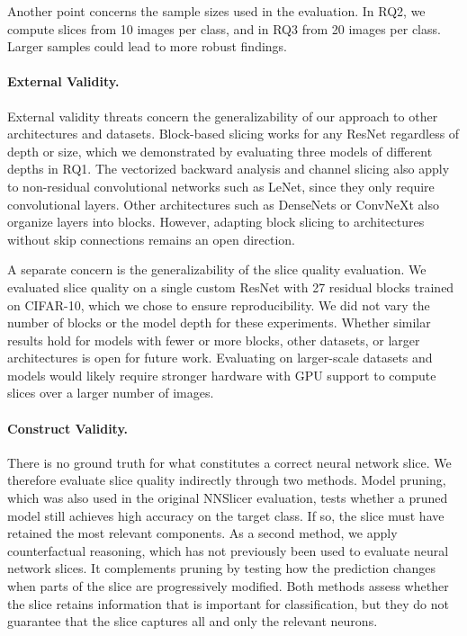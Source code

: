 \documentclass[
12pt,
fancyheadings,
a4paper,
twoside,
BCOR=0.7cm,
nobcorignoretitle,
grayscalebody,
]{stsreprt}
\begin{document}
Another point concerns the sample sizes used in the evaluation.
In RQ2, we compute slices from 10 images per class, and in RQ3 from 20 images per class.
Larger samples could lead to more robust findings.

\paragraph{External Validity.}
External validity threats concern the generalizability of our approach to other architectures and
datasets.
Block-based slicing works for any ResNet regardless of depth or size, which we demonstrated by
evaluating three models of different depths in RQ1.
The vectorized backward analysis and channel slicing also apply to non-residual convolutional
networks such as LeNet, since they only require convolutional layers.
Other architectures such as DenseNets or ConvNeXt also organize layers into blocks. However,
adapting block slicing to architectures without skip connections remains an open direction.

A separate concern is the generalizability of the slice quality evaluation.
We evaluated slice quality on a single custom ResNet with 27 residual blocks trained on CIFAR-10,
which we chose to ensure reproducibility. We did not vary the number of blocks or the model depth
for these experiments.
Whether similar results hold for models with fewer or more blocks, other datasets, or larger
architectures is open for future work. 
Evaluating on larger-scale datasets and models would likely require stronger hardware with GPU
support to compute slices over a larger number of images.

\paragraph{Construct Validity.}
There is no ground truth for what constitutes a correct neural network slice.
We therefore evaluate slice quality indirectly through two methods.
Model pruning, which was also used in the original NNSlicer evaluation, tests whether a pruned
model still achieves high accuracy on the target class. If so, the slice must have retained the
most relevant components.
As a second method, we apply counterfactual reasoning, which has not previously been used to
evaluate neural network slices. It complements pruning by testing how the prediction changes when
parts of the slice are progressively modified.
Both methods assess whether the slice retains information that is important for classification, but
they do not guarantee that the slice captures all and only the relevant neurons.
\end{document}
